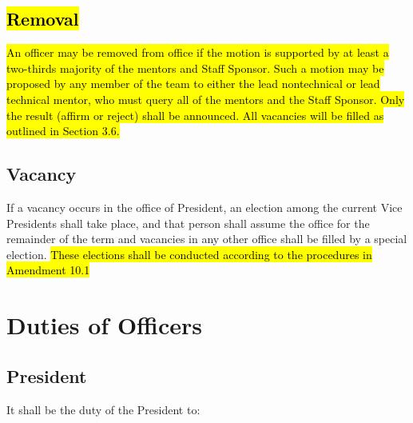 \documentclass[12pt, a4paper]{article}
\begin{document}
\subsection{\hl{Removal}}
\hl{An officer may be removed from office if the motion is supported by at least a two-thirds majority of the mentors and Staff Sponsor. 
Such a motion may be proposed by any member of the team to either the lead nontechnical or lead technical mentor, who must query all of the mentors and the Staff Sponsor. 
Only the result (affirm or reject) shall be announced. All vacancies will be filled as outlined in Section 3.6.}
\subsection{Vacancy}
If a vacancy occurs in the office of President, an election among the current Vice Presidents shall take place, and that person shall assume the office for the remainder of the term and vacancies in any other office shall be filled by a special election. 
\hl{These elections shall be conducted according to the procedures in Amendment 10.1}
\section{Duties of Officers}
\subsection{President}
It shall be the duty of the President to:
\end{document}
